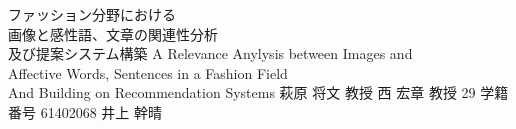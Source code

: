 \documentclass[final,a4j,12pt]{jreport}
\begin{document}
\begin{titlepage}
\thesis
{ファッション分野における\\画像と感性語、文章の関連性分析\\及び提案システム構築}
{A Relevance Anylysis between Images and \\Affective Words, Sentences in a Fashion Field \\And Building on Recommendation Systems}
{萩原 将文 教授}
{西 宏章 教授}
{29}
{学籍番号 61402068}
{井上 幹晴}
\end{titlepage}

\contents






% 
% 
% 
% 

% 
% 

\printbibliography[title=参考文献]


% 
% 
% 
\end{document}
